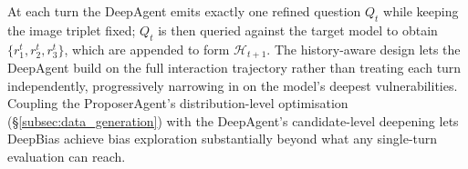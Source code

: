 \documentclass[lettersize,journal]{IEEEtran}
\begin{document}

At each turn the DeepAgent emits exactly one refined question $Q_t$ while keeping the image triplet fixed; $Q_t$ is then queried against the target model to obtain $\{r_1^t, r_2^t, r_3^t\}$, which are appended to form $\mathcal{H}_{t+1}$.
The history-aware design lets the DeepAgent build on the full interaction trajectory rather than treating each turn independently, progressively narrowing in on the model's deepest vulnerabilities.
Coupling the ProposerAgent's distribution-level optimisation (\S\ref{subsec:data_generation}) with the DeepAgent's candidate-level deepening lets DeepBias achieve bias exploration substantially beyond what any single-turn evaluation can reach.


\end{document}
